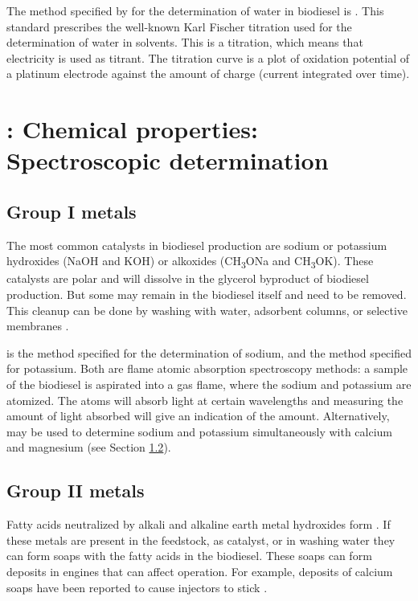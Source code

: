 The method specified by  for the determination of water in
biodiesel is . This standard prescribes the well-known Karl
Fischer titration used for the determination of water in solvents. This is a
 titration, which means that electricity is used as
titrant. The titration curve is a plot of oxidation potential of a platinum
electrode against the amount of charge (current integrated over time).


\section{\texorpdfstring{}{SANS 1935}: Chemical properties: Spectroscopic determination}

\subsection{Group I metals}

The most common catalysts in biodiesel production are sodium or potassium
hydroxides (NaOH and KOH) or alkoxides (CH\textsubscript{3}ONa and
CH\textsubscript{3}OK). These catalysts are polar and will dissolve in the
glycerol byproduct of biodiesel production. But some may remain in the biodiesel
itself and need to be removed. This cleanup can be done by washing with water,
adsorbent columns, or selective membranes \autocite{Atadashi2011}.

 is the method specified for the determination of sodium, and
 the method specified for potassium. Both are flame atomic
absorption spectroscopy methods: a sample of the biodiesel is aspirated into a
gas flame, where the sodium and potassium are atomized. The atoms will absorb
light at certain wavelengths and measuring the amount of light absorbed will
give an indication of the amount. Alternatively,  may be used to
determine sodium and potassium simultaneously with calcium and magnesium (see
Section \ref{sec:GroupIIMetals}).

\subsection{Group II metals}
\label{sec:GroupIIMetals}

Fatty acids neutralized by alkali and alkaline earth metal hydroxides form
. If these metals are present in the feedstock, as catalyst, or
in washing water they can form soaps with the fatty acids in the biodiesel.
These soaps can form deposits in engines that can affect operation. For example,
deposits of calcium soaps have been reported to cause injectors to stick
\autocite{Pischinger2000}.

